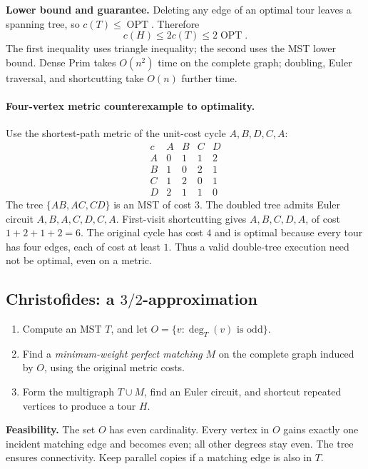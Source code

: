 \documentclass[10pt]{article}
\theoremstyle{definition}
\newcommand{\OPT}{\operatorname{OPT}}
\begin{document}
\textbf{Lower bound and guarantee.} Deleting any edge of an optimal tour
leaves a spanning tree, so $c(T)\le\OPT$.  Therefore
\[
\boxed{\ c(H)\le 2c(T)\le2\OPT.\ }
\]
The first inequality uses triangle inequality; the second uses the MST lower
bound.  Dense Prim takes $O(n^2)$ time on the complete graph; doubling,
Euler traversal, and shortcutting take $O(n)$ further time.

\paragraph{Four-vertex metric counterexample to optimality.}
Use the shortest-path metric of the unit-cost cycle $A,B,D,C,A$:
\[
\begin{array}{c|rrrr}
c & A&B&C&D\\\hline
A&0&1&1&2\\
B&1&0&2&1\\
C&1&2&0&1\\
D&2&1&1&0
\end{array}
\]
The tree $\{AB,AC,CD\}$ is an MST of cost $3$.  The doubled tree admits
Euler circuit $A,B,A,C,D,C,A$.  First-visit shortcutting gives
$A,B,C,D,A$, of cost $1+2+1+2=6$.  The original cycle has cost $4$ and is
optimal because every tour has four edges, each of cost at least $1$.
Thus a valid double-tree execution need not be optimal, even on a metric.

\subsection{Christofides: a \texorpdfstring{$3/2$}{3/2}-approximation}\label{tsp:christofides}
\begin{enumerate}
  \item Compute an MST $T$, and let $O=\{v:\deg_T(v)\text{ is odd}\}$.
  \item Find a \emph{minimum-weight perfect matching} $M$ on the complete
        graph induced by $O$, using the original metric costs.
  \item Form the multigraph $T\cup M$, find an Euler circuit, and shortcut
        repeated vertices to produce a tour $H$.
\end{enumerate}
\textbf{Feasibility.} The set $O$ has even cardinality.  Every vertex in
$O$ gains exactly one incident matching edge and becomes even; all other
degrees stay even.  The tree ensures connectivity.  Keep parallel copies
if a matching edge is also in $T$.
\end{document}

